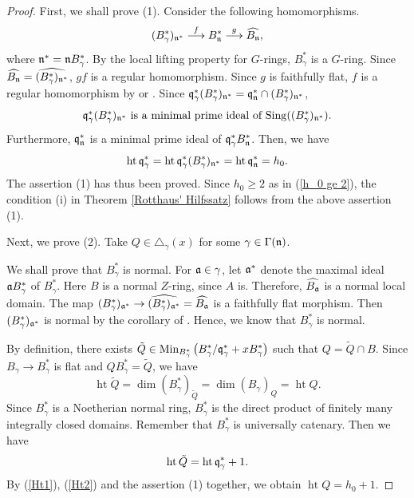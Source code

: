 \documentclass[11pt,a4paper]{amsart}
\theoremstyle{definition}
\theoremstyle{remark}
\newcommand{\Ht}{\operatorname{ht}}
\newcommand{\fq}{\frak{q}}
\newcommand{\fa}{\frak{a}}
\newcommand{\fn}{\frak{n}}
\begin{document}
\begin{proof}
First, we shall prove (1). Consider the following homomorphisms.
\begin{equation}\label{gf}
(B_\gamma^*)_{\fn^*} \stackrel{f}{\longrightarrow}
B_\fn^* \stackrel{g}{\longrightarrow} \widehat{B_\fn},
\end{equation}
where $\fn^*=\fn B_{\gamma}^*$. By the local lifting property for $G$-rings, $B_\gamma^*$ is a $G$-ring.
Since $\widehat{B_\fn} = \widehat{(B_\gamma^*)_{\fn^*}}$,
$gf$ is a regular homomorphism.
Since $g$ is faithfully flat, $f$ is a regular homomorphism
by \cite[(33.B)]{Ma80} or \cite[Theorem 32.1]{Ma86}.
Since $\fq_\gamma^*(B_\gamma^*)_{\fn^*} = \fq_\fn^* \cap (B_\gamma^*)_{\fn^*}$,
\begin{equation}\label{min}
\mbox{$\fq_\gamma^*(B_\gamma^*)_{\fn^*}$ is a minimal prime ideal of
${\rm Sing}((B_\gamma^*)_{\fn^*})$.}
\end{equation}
Furthermore, $\fq_\fn^*$ is a minimal prime ideal of $\fq_\gamma^*B_\fn^*$.
Then, we have
\[
\Ht \fq_\gamma^* = \Ht \fq_\gamma^* (B_\gamma^*)_{\fn^*}
 = \Ht \fq_\fn^* = h_0.
\]
The assertion (1) has thus been proved. Since $h_0 \ge 2$ as in (\ref{h_0 ge 2}), the condition (i) in Theorem \ref{Rotthaus' Hilfssatz} follows from the above assertion (1).

Next, we prove (2).
Take $Q \in \triangle_\gamma(x)$ for some $\gamma \in \Gamma(\fn)$.

We shall prove that $B_\gamma^*$ is normal. For $\fa \in \gamma$, let $\fa^*$ denote the maximal ideal $\fa B_\gamma^*$ of $B_\gamma^*$. Here $B$ is a normal $Z$-ring, since $A$ is.
Therefore, $\widehat{B_\fa}$ is a normal local domain.
The map $(B_\gamma^*)_{\fa^*} \rightarrow \widehat{(B_\gamma^*)_{\fa^*}}
= \widehat{B_\fa}$ is a faithfully flat morphism.
Then $(B_\gamma^*)_{\fa^*}$ is normal by the corollary of \cite[Theorem 23.9]{Ma86}.
Hence, we know that $B_\gamma^*$ is normal.

By definition, there exists $\tilde{Q} \in {\rm Min}_{B_\gamma^*}\left( B_\gamma^*/
\fq_\gamma^* + xB_\gamma^* \right)$ such that $Q = \tilde{Q} \cap B$.
Since $B_\gamma \rightarrow B_\gamma^*$ is flat and 
$QB_\gamma^* = \tilde{Q}$, we have
\begin{equation}\label{Ht1}
\Ht \tilde{Q} = \dim (B_\gamma^*)_{\tilde{Q}} = \dim (B_\gamma)_Q = \Ht Q .
\end{equation}
Since $B_\gamma^*$ is a Noetherian normal ring, $B_\gamma^*$ is the direct product of finitely many integrally closed domains.
Remember that $B_\gamma^*$ is universally catenary.
Then we have
\begin{equation}\label{Ht2}
\Ht  \tilde{Q} = \Ht \fq_\gamma^* + 1 .
\end{equation}
By (\ref{Ht1}), (\ref{Ht2}) and the assertion (1) together, we obtain $\Ht Q = h_0+1$.


\end{proof}
\end{document}
